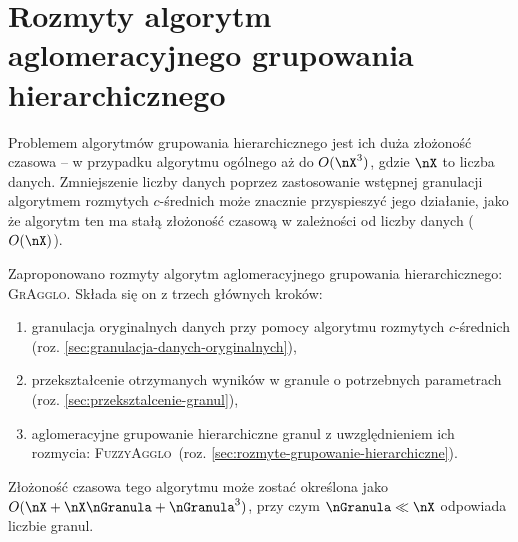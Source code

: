 \documentclass[a4paper,twoside,12pt]{book}
\newcommand{\procedura}[1]{\textsc{#1}}
\newcommand{\MojAlg}{\procedura{GrAgglo}}
\newcommand{\MojHierAlg}{\procedura{FuzzyAgglo}}
\begin{document}
\chapter{Rozmyty algorytm aglomeracyjnego grupowania hierarchicznego}
\label{sec:wlasne-rozwiazanie}



Problemem algorytmów grupowania hierarchicznego jest ich duża złożoność czasowa -- w przypadku algorytmu ogólnego aż do $O(\nX^{3})$, gdzie $\nX$ to liczba danych. Zmniejszenie liczby danych poprzez zastosowanie wstępnej granulacji algorytmem rozmytych $c$-średnich może znacznie przyspieszyć jego działanie, jako że algorytm ten ma stałą złożoność czasową w zależności od liczby danych ($O(\nX)$).

Zaproponowano rozmyty algorytm aglomeracyjnego grupowania hierarchicznego: \MojAlg{}. Składa się on z trzech głównych kroków:

\begin{enumerate}
	\item granulacja oryginalnych danych przy pomocy algorytmu rozmytych $c$-średnich (roz. \ref{sec:granulacja-danych-oryginalnych}),
	\item przekształcenie otrzymanych wyników w granule o potrzebnych parametrach (roz. \ref{sec:przeksztalcenie-granul}),
	\item aglomeracyjne grupowanie hierarchiczne granul z uwzględnieniem ich rozmycia: \MojHierAlg\ (roz. \ref{sec:rozmyte-grupowanie-hierarchiczne}).
\end{enumerate}

Złożoność czasowa tego algorytmu może zostać określona jako $O(\nX + \nX\nGranula + \nGranula^3)$, przy czym $\nGranula \ll \nX$ odpowiada liczbie granul.
\end{document}

